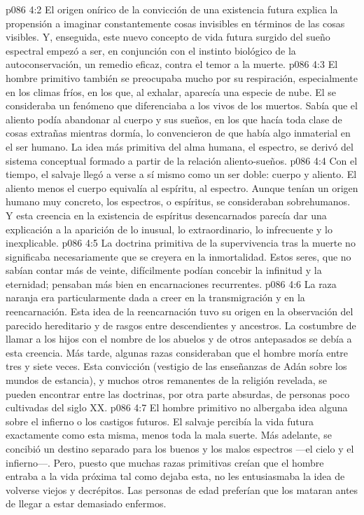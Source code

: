 \vs p086 4:2 El origen onírico de la convicción de una existencia futura explica la propensión a imaginar constantemente cosas invisibles en términos de las cosas visibles. Y, enseguida, este nuevo concepto de vida futura surgido del sueño espectral empezó a ser, en conjunción con el instinto biológico de la autoconservación, un remedio eficaz, contra el temor a la muerte.
\vs p086 4:3 El hombre primitivo también se preocupaba mucho por su respiración, especialmente en los climas fríos, en los que, al exhalar, aparecía una especie de nube. El  se consideraba un fenómeno que diferenciaba a los vivos de los muertos. Sabía que el aliento podía abandonar al cuerpo y sus sueños, en los que hacía toda clase de cosas extrañas mientras dormía, lo convencieron de que había algo inmaterial en el ser humano. La idea más primitiva del alma humana, el espectro, se derivó del sistema conceptual formado a partir de la relación aliento\hyp{}sueños.
\vs p086 4:4 Con el tiempo, el salvaje llegó a verse a sí mismo como un ser doble: cuerpo y aliento. El aliento menos el cuerpo equivalía al espíritu, al espectro. Aunque tenían un origen humano muy concreto, los espectros, o espíritus, se consideraban sobrehumanos. Y esta creencia en la existencia de espíritus desencarnados parecía dar una explicación a la aparición de lo inusual, lo extraordinario, lo infrecuente y lo inexplicable.
\vs p086 4:5 \pc La doctrina primitiva de la supervivencia tras la muerte no significaba necesariamente que se creyera en la inmortalidad. Estos seres, que no sabían contar más de veinte, difícilmente podían concebir la infinitud y la eternidad; pensaban más bien en encarnaciones recurrentes.
\vs p086 4:6 La raza naranja era particularmente dada a creer en la transmigración y en la reencarnación. Esta idea de la reencarnación tuvo su origen en la observación del parecido hereditario y de rasgos entre descendientes y ancestros. La costumbre de llamar a los hijos con el nombre de los abuelos y de otros antepasados se debía a esta creencia. Más tarde, algunas razas consideraban que el hombre moría entre tres y siete veces. Esta convicción (vestigio de las enseñanzas de Adán sobre los mundos de estancia), y muchos otros remanentes de la religión revelada, se pueden encontrar entre las doctrinas, por otra parte absurdas, de personas poco cultivadas del siglo XX.
\vs p086 4:7 \pc El hombre primitivo no albergaba idea alguna sobre el infierno o los castigos futuros. El salvaje percibía la vida futura exactamente como esta misma, menos toda la mala suerte. Más adelante, se concibió un destino separado para los buenos y los malos espectros ---el cielo y el infierno---. Pero, puesto que muchas razas primitivas creían que el hombre entraba a la vida próxima tal como dejaba esta, no les entusiasmaba la idea de volverse viejos y decrépitos. Las personas de edad preferían que los mataran antes de llegar a estar demasiado enfermos.

